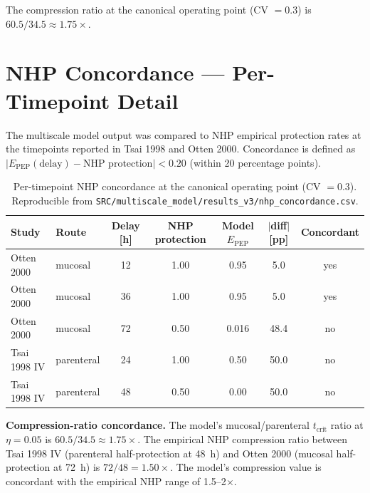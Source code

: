 \documentclass[11pt]{article}
\theoremstyle{definition}
\theoremstyle{remark}
\newcommand{\Epep}{E_{\text{PEP}}}
\newcommand{\tcrit}{t_{\text{crit}}}
\begin{document}
The compression ratio at the canonical operating point (CV $= 0.3$) is $60.5/34.5 \approx 1.75\times$.


\section{NHP Concordance --- Per-Timepoint Detail}

The multiscale model output was compared to NHP empirical protection rates at the timepoints reported in Tsai 1998\cite{tsai1995_si} and Otten 2000\cite{otten2000_si}. Concordance is defined as $|\Epep(\text{delay}) - \text{NHP protection}| < 0.20$ (within 20 percentage points).

\begin{table}[H]
\centering
\small
\caption{Per-timepoint NHP concordance at the canonical operating point (CV $= 0.3$). Reproducible from \texttt{SRC/multiscale\_model/results\_v3/nhp\_concordance.csv}.}
\begin{tabular}{@{}llccccc@{}}
\toprule
\textbf{Study} & \textbf{Route} & \textbf{Delay [h]} & \textbf{NHP protection} & \textbf{Model $\Epep$} & \textbf{$|$diff$|$ [pp]} & \textbf{Concordant} \\
\midrule
Otten 2000      & mucosal    & 12 & 1.00 & 0.95 & 5.0  & yes \\
Otten 2000      & mucosal    & 36 & 1.00 & 0.95 & 5.0  & yes \\
Otten 2000      & mucosal    & 72 & 0.50 & 0.016 & 48.4 & no  \\
Tsai 1998 IV    & parenteral & 24 & 1.00 & 0.50 & 50.0 & no  \\
Tsai 1998 IV    & parenteral & 48 & 0.50 & 0.00 & 50.0 & no  \\
\bottomrule
\end{tabular}
\end{table}

\textbf{Compression-ratio concordance.} The model's mucosal/parenteral $\tcrit$ ratio at $\eta = 0.05$ is $60.5/34.5 \approx 1.75\times$. The empirical NHP compression ratio between Tsai 1998 IV (parenteral half-protection at 48~h) and Otten 2000 (mucosal half-protection at 72~h) is $72/48 = 1.50\times$. The model's compression value is concordant with the empirical NHP range of 1.5--2$\times$.
\end{document}
